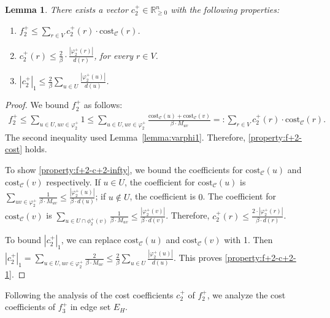 \documentclass[11pt]{article}
\newcommand{\R}{\mathbb{R}}
\newcommand{\cost}{\mathrm{cost}}
\newtheorem{lemma}[theorem]{Lemma}
\newcommand{\calC}{{\mathcal{C}}}
\begin{document}
\begin{CJK*}{UTF8}{gbsn}
\begin{lemma}
    \label{lemma:f+2}
    There exists a vector $c^+_2 \in \R_{\geq 0}^{n}$ with the following properties:
    \begin{enumerate}[label=(\ref{lemma:f+2}\alph*)]
        \item \label{property:f+2-cost} $f^+_2 \leq \sum_{r \in V}c^+_2(r)\cdot \cost_\calC(r)$.
        \item \label{property:f+2-c+2-infty} $c^+_2(r) \leq \frac{2}{\beta} \cdot \frac{|\varphi^+_2(r)|}{d(r)}$, for every $r \in V$.
        \item \label{property:f+2-c+2-1} $|c^+_2|_1 \leq \frac2\beta\sum_{u \in U}\frac{|\varphi^+_2(u)|}{d(u)}$.
    \end{enumerate}
\end{lemma}
\begin{proof}
    We bound $f^+_2$ as follows:
    \begin{align*}
        f^+_2 \leq \sum_{u \in U, uv \in \varphi^+_2} 1 \leq
        \sum_{u \in U, uv \in \varphi^+_2} \frac{\cost_{\mathcal{C}}(u)+ \cost_{\mathcal{C}}(v)}{\beta\cdot M_{uv}} =: \sum_{r \in V} c^+_2(r) \cdot \cost_\calC(r). 
    \end{align*}
    The second inequality used Lemma~\ref{lemma:varphi1}.  Therefore, \ref{property:f+2-cost} holds.

To show \ref{property:f+2-c+2-infty}, we bound the coefficients for $\cost_\calC(u)$ and $\cost_\calC(v)$ respectively.  If $u \in U$, the coefficient for $\cost_\calC(u)$ is $\sum_{uv \in \varphi^+_2}\frac{1}{\beta \cdot M_{uv}} \leq \frac{|\varphi^+_2(u)|}{\beta \cdot d(u)}$; if $u \notin U$, the coefficient is $0$.  The coefficient for $\cost_\calC(v)$ is $\sum_{u \in U \cap \phi^+_2(v)} \frac{1}{\beta\cdot M_{uv}} \leq \frac{|\varphi^+_2(v)|}{\beta \cdot d(v)}$. Therefore, $c^+_2(r) \leq \frac{2\cdot|\varphi^+_2(r)|}{\beta\cdot d(r)}$.

    To bound $|c^+_2|_1$, we can replace $\cost_\calC(u)$ and $\cost_\calC(v)$ with 1. Then $|c^+_2|_1 = \sum_{u \in U, uv\in\varphi^+_2}\frac{2}{\beta \cdot M_{uv}} \leq \frac2\beta\sum_{u \in U}\frac{|\varphi^+_2(u)|}{d(u)}$. This proves \ref{property:f+2-c+2-1}. 
\end{proof}

Following the analysis of the cost coefficients $c^+_2$ of $f^+_2$, we analyze the cost coefficients of $f^+_3$ in edge set $E_H$.


\end{CJK*}
\end{document}
